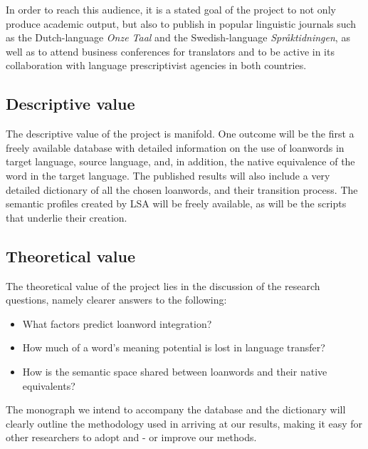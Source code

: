 \documentclass[a4paper]{article}
\begin{document}
In order to reach this audience, it is a stated goal of the project to not only produce academic output, but also to publish in popular linguistic journals such as the Dutch-language \emph{Onze Taal} and the Swedish-language \emph{Spr\aa ktidningen}, as well as to attend business conferences for translators and to be active in its collaboration with language prescriptivist agencies in both countries. 

\subsection{Descriptive value}
The descriptive value of the project is manifold. One outcome will be the first a freely available database with detailed information on the use of loanwords in target language, source language, and, in addition, the native equivalence of the word in the target language. The published results will also include a very detailed dictionary of all the chosen loanwords, and their transition process. The semantic profiles created by LSA will be freely available, as will be the scripts that underlie their creation. 



\subsection{Theoretical value}
The theoretical value of the project lies in the discussion of the research questions, namely clearer answers to the following:
\begin{itemize}
	\item What factors predict loanword integration?
	\item How much of a word's meaning potential is lost in language transfer?
	\item How is the semantic space shared between loanwords and their native equivalents?	
\end{itemize}

The monograph we intend to accompany the database and the dictionary will clearly outline the methodology used in arriving at our results, making it easy for other researchers to adopt and - or improve our methods.


\end{document}
